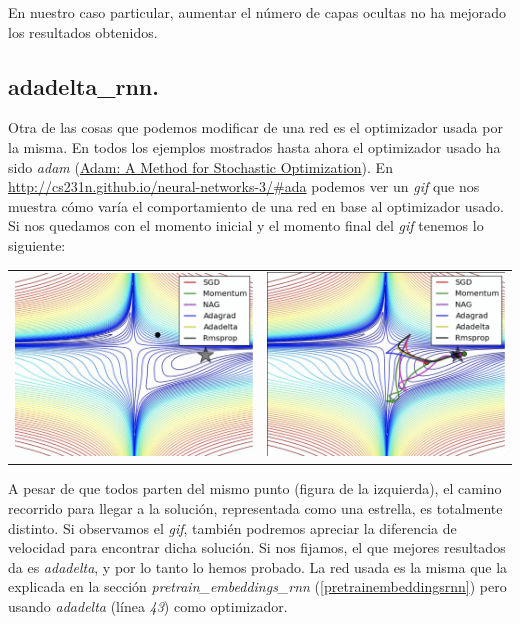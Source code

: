 \documentclass[11pt]{article}
\begin{document}


En nuestro caso particular, aumentar el número de capas ocultas no ha mejorado los resultados obtenidos.

\subsection{adadelta\_rnn.} \label{adadeltarnn}

Otra de las cosas que podemos modificar de una red es el optimizador usada por la misma. En todos los ejemplos mostrados hasta ahora el optimizador usado ha sido \textit{adam} (\href{https://arxiv.org/abs/1412.6980v8}{Adam: A Method for Stochastic Optimization}). En \href{http://cs231n.github.io/neural-networks-3/#ada}{http://cs231n.github.io/neural-networks-3/\#ada} podemos ver un \textit{gif} que nos muestra cómo varía el comportamiento de una red en base al optimizador usado. Si nos quedamos con el momento inicial y el momento final del \textit{gif} tenemos lo siguiente:

\begin{table}[H]
\centering
\begin{tabular}{cc}
\includegraphics[width=0.4\linewidth]{images/optimizers_1.png} & \includegraphics[width=0.4\linewidth]{images/optimizers_2.png}
\end{tabular}
\end{table}

A pesar de que todos parten del mismo punto (figura de la izquierda), el camino recorrido para llegar a la solución, representada como una estrella, es totalmente distinto. Si observamos el \textit{gif}, también podremos apreciar la diferencia de velocidad para encontrar dicha solución. Si nos fijamos, el que mejores resultados da es \textit{adadelta}, y por lo tanto lo hemos probado. La red usada es la misma que la explicada en la sección \textit{pretrain\_embeddings\_rnn} (\ref{pretrainembeddingsrnn}) pero usando \textit{adadelta} (línea \textit{43}) como optimizador.
\end{document}
